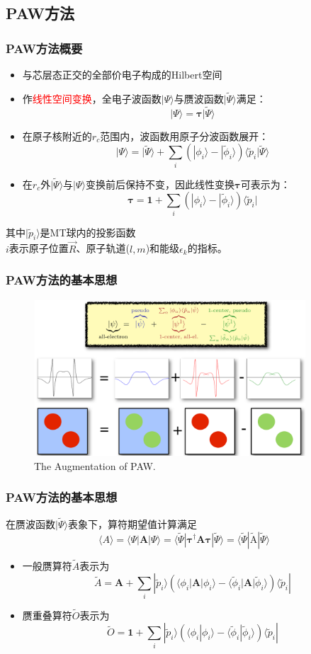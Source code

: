 \subsection{\rm{PAW}方法}
\frame
{
	\frametitle{\textrm{PAW}方法概要}
\begin{itemize}
	\item 与芯层态正交的全部价电子构成的\textrm{Hilbert}空间%
	\item 作\textcolor{red}{线性空间变换}，全电子波函数$|\Psi\rangle$与赝波函数$|\tilde\Psi\rangle$满足：
		$$|\Psi\rangle=\mathbf{\tau|}\tilde\Psi\rangle$$
	\item 在原子核附近的$r_c$范围内，波函数用原子分波函数展开：
	$$|\Psi\rangle=|\tilde\Psi\rangle+\sum_i(|\phi_i\rangle-|\tilde\phi_i\rangle)\langle\tilde p_i|\tilde\Psi\rangle$$
	\item 在$r_c$外$|\tilde\Psi\rangle$与$|\Psi\rangle$变换前后保持不变，因此线性变换$\mathbf{\tau}$可表示为：
	$$\mathbf{\tau}=\mathbf{1}+\sum_i(|\phi_i\rangle-|\tilde\phi_i\rangle)\langle\tilde p_i|$$
\end{itemize}
其中$|\tilde p_i\rangle$是\textrm{MT}球内的投影函数\\
$i$表示原子位置$\vec R$、原子轨道($l,m$)和能级$\epsilon_k$的指标。
}

\frame
{
	\frametitle{\textrm{PAW}方法的基本思想}
\begin{figure}[h!]
\centering
\includegraphics[height=2.3in,width=4.0in,viewport=0 0 1280 745,clip]{Figures/PAW-baseset.png}
\caption{\tiny \textrm{The Augmentation of PAW.}}%
\label{PAW_baseset}
\end{figure}
}

\frame
{
\frametitle{\textrm{PAW}方法的基本思想}
	在赝波函数$|\tilde\Psi\rangle$表象下，算符期望值计算满足$$\langle A \rangle=\langle\Psi|\mathbf{A}|\Psi\rangle=\langle\tilde\Psi|\mathbf{\tau}^{\dag}\mathbf{A}\mathbf{\tau}|\tilde\Psi\rangle=\langle\tilde\Psi|\tilde{\mathrm{A}}|\tilde\Psi\rangle$$
\begin{itemize}
	\item 一般赝算符$\tilde A$表示为
		$$\tilde A=\mathbf{A}+\sum_i|\tilde p_i\rangle(\langle\phi_i|\mathbf{A}|\phi_i\rangle-\langle\tilde\phi_i|\mathbf{A}|\tilde\phi_i\rangle)\langle\tilde p_i|$$
	\item 赝重叠算符$\tilde O$表示为
		$$\tilde O=\mathbf{1}+\sum_i|\tilde p_i\rangle(\langle\phi_i|\phi_i\rangle-\langle\tilde\phi_i|\tilde\phi_i\rangle)\langle\tilde p_i|$$
\end{itemize}
}

